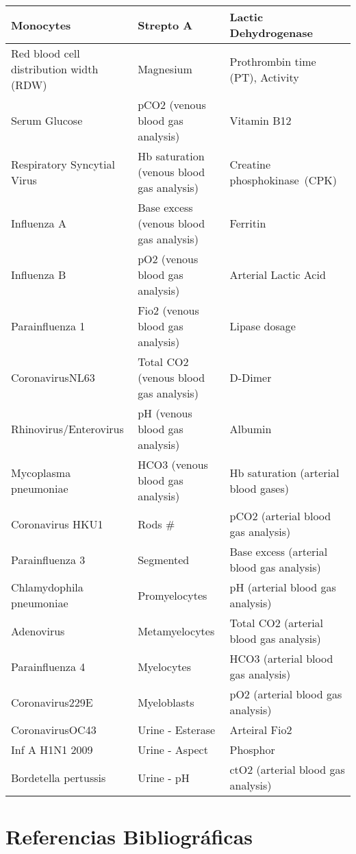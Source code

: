 \documentclass[
]{article}
\begin{document}
\begin{tabular}{l|l|l}
\hline
Monocytes & Strepto A & Lactic Dehydrogenase\\
\hline
Red blood cell distribution width (RDW) & Magnesium & Prothrombin time (PT), Activity\\
\hline
Serum Glucose & pCO2 (venous blood gas analysis) & Vitamin B12\\
\hline
Respiratory Syncytial Virus & Hb saturation (venous blood gas analysis) & Creatine phosphokinase (CPK) \\
\hline
Influenza A & Base excess (venous blood gas analysis) & Ferritin\\
\hline
Influenza B & pO2 (venous blood gas analysis) & Arterial Lactic Acid\\
\hline
Parainfluenza 1 & Fio2 (venous blood gas analysis) & Lipase dosage\\
\hline
CoronavirusNL63 & Total CO2 (venous blood gas analysis) & D-Dimer\\
\hline
Rhinovirus/Enterovirus & pH (venous blood gas analysis) & Albumin\\
\hline
Mycoplasma pneumoniae & HCO3 (venous blood gas analysis) & Hb saturation (arterial blood gases)\\
\hline
Coronavirus HKU1 & Rods \# & pCO2 (arterial blood gas analysis)\\
\hline
Parainfluenza 3 & Segmented & Base excess (arterial blood gas analysis)\\
\hline
Chlamydophila pneumoniae & Promyelocytes & pH (arterial blood gas analysis)\\
\hline
Adenovirus & Metamyelocytes & Total CO2 (arterial blood gas analysis)\\
\hline
Parainfluenza 4 & Myelocytes & HCO3 (arterial blood gas analysis)\\
\hline
Coronavirus229E & Myeloblasts & pO2 (arterial blood gas analysis)\\
\hline
CoronavirusOC43 & Urine - Esterase & Arteiral Fio2\\
\hline
Inf A H1N1 2009 & Urine - Aspect & Phosphor\\
\hline
Bordetella pertussis & Urine - pH & ctO2 (arterial blood gas analysis)\\
\hline
\end{tabular}

\pagebreak

\hypertarget{referencias-bibliogruxe1ficas}{%
\section{Referencias Bibliográficas}\label{referencias-bibliogruxe1ficas}}
\end{document}
